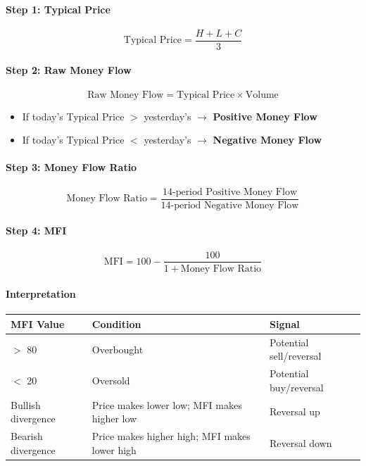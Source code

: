 \documentclass[12pt,openany]{book}
\begin{document}
\paragraph{Step 1: Typical Price}
\[
\text{Typical Price} = \frac{H + L + C}{3}
\]

\paragraph{Step 2: Raw Money Flow}
\[
\text{Raw Money Flow} = \text{Typical Price} \times \text{Volume}
\]

\begin{itemize}[leftmargin=*]
    \item If today's Typical Price \(>\) yesterday's \(\rightarrow\) \textbf{Positive Money Flow}
    \item If today's Typical Price \(<\) yesterday's \(\rightarrow\) \textbf{Negative Money Flow}
\end{itemize}

\paragraph{Step 3: Money Flow Ratio}
\[
\text{Money Flow Ratio} = \frac{\text{14-period Positive Money Flow}}{\text{14-period Negative Money Flow}}
\]

\paragraph{Step 4: MFI}
\[
\text{MFI} = 100 - \frac{100}{1 + \text{Money Flow Ratio}}
\]

\paragraph{Interpretation}

\begin{center}
\small
\renewcommand{\arraystretch}{1.2}
\begin{tabular}{|L{0.25\textwidth}|L{0.34\textwidth}|L{0.31\textwidth}|}
\hline
 \textbf{MFI Value} & \textbf{Condition} & \textbf{Signal} \\ \hline
 \(>\) 80 & Overbought & Potential sell/reversal \\ \hline
 \(<\) 20 & Oversold & Potential buy/reversal \\ \hline
 Bullish divergence & Price makes lower low; MFI makes higher low & Reversal up \\ \hline
 Bearish divergence & Price makes higher high; MFI makes lower high & Reversal down \\ \hline
\end{tabular}
\end{center}
\end{document}
